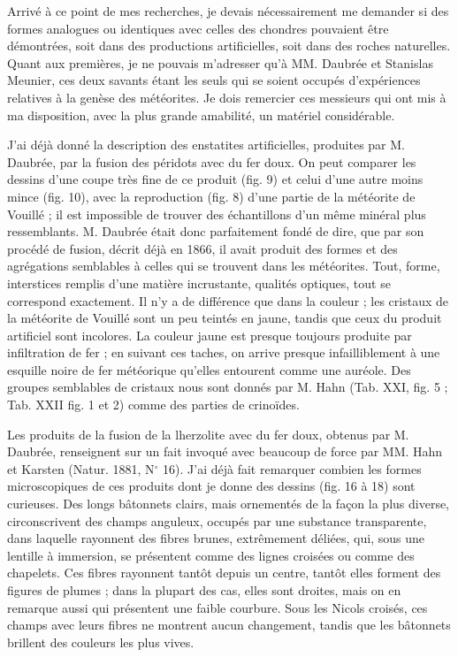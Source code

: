\documentclass[a4paper, 12pt, oneside, french]{book}
\begin{document}
Arrivé à ce point de mes recherches, je devais nécessairement me demander si des formes analogues ou identiques avec celles des chondres pouvaient être démontrées, soit dans des productions artificielles, soit dans des roches naturelles. Quant aux premières, je ne pouvais m'adresser qu'à MM. Daubrée et Stanislas Meunier, ces deux savants étant les seuls qui se soient occupés d'expériences relatives à la genèse des météorites. Je dois remercier ces messieurs qui ont mis à ma disposition, avec la plus grande amabilité, un matériel considérable.

J'ai déjà donné la description des enstatites artificielles, produites par M. Daubrée, par la fusion des péridots avec du fer doux. On peut comparer les dessins d'une coupe très fine de ce produit (fig. 9) et celui d'une autre moins mince (fig. 10), avec la reproduction (fig. 8) d'une partie de la météorite de Vouillé ; il est impossible de trouver des échantillons d'un même minéral plus ressemblants. M. Daubrée était donc parfaitement fondé de dire, que par son procédé de fusion, décrit déjà en 1866, il avait produit des formes et des agrégations semblables à celles qui se trouvent dans les météorites. Tout, forme, interstices remplis d'une matière incrustante, qualités optiques, tout se correspond exactement. Il n'y a de différence que dans la couleur ; les cristaux de la météorite de Vouillé sont un peu teintés en jaune, tandis que ceux du produit artificiel sont incolores. La couleur jaune est presque toujours produite par infiltration de fer ; en suivant ces taches, on arrive presque infailliblement à une esquille noire de fer météorique qu'elles entourent comme une auréole. Des groupes semblables de cristaux nous sont donnés par M. Hahn (Tab. XXI, fig. 5 ; Tab. XXII fig. 1 et 2) comme des parties de crinoïdes.

Les produits de la fusion de la lherzolite avec du fer doux, obtenus par M. Daubrée, renseignent sur un fait invoqué avec beaucoup de force par MM. Hahn et Karsten (Natur. 1881, N$^{\circ}$ 16). J'ai déjà fait remarquer combien les formes microscopiques de ces produits dont je donne des dessins (fig. 16 à 18) sont curieuses. Des longs bâtonnets clairs, mais ornementés de la façon la plus diverse, circonscrivent des champs anguleux, occupés par une substance transparente, dans laquelle rayonnent des fibres brunes, extrêmement déliées, qui, sous une lentille à immersion, se présentent comme des lignes croisées ou comme des chapelets. Ces fibres rayonnent tantôt depuis un centre, tantôt elles forment des figures de plumes ; dans la plupart des cas, elles sont droites, mais on en remarque aussi qui présentent une faible courbure. Sous les Nicols croisés, ces champs avec leurs fibres ne montrent aucun changement, tandis que les bâtonnets brillent des couleurs les plus vives.
\end{document}
